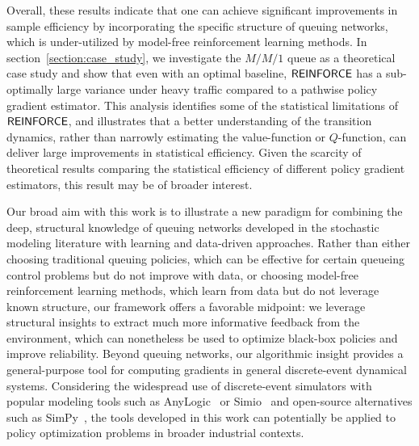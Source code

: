 Overall, these results indicate that one can achieve significant improvements in sample efficiency by incorporating the specific structure of queuing networks, which is under-utilized by model-free reinforcement learning methods. In section~\ref{section:case_study}, we investigate the $M/M/1$ queue as a theoretical case study and show that even with an optimal baseline, $\mathsf{REINFORCE}$ has a sub-optimally large variance under heavy traffic compared to a pathwise policy gradient estimator. This analysis identifies some of the statistical limitations of $\mathsf{REINFORCE}$, and illustrates that a better understanding of the transition dynamics, rather than narrowly estimating the value-function or $Q$-function, can deliver large improvements in statistical efficiency. Given the scarcity of theoretical results comparing the statistical efficiency of different policy gradient estimators, this result may be of broader interest.

Our broad aim with this work is to illustrate a new paradigm for combining the deep, structural knowledge of queuing networks developed in the stochastic modeling literature with learning and data-driven approaches.
Rather than either choosing traditional queuing policies, which can be effective for certain queueing control problems but do not improve with data, or choosing model-free reinforcement learning methods, which learn from data but do not leverage known structure, our framework offers a favorable midpoint: we leverage structural insights to extract much more informative feedback from the environment, which can nonetheless be used to optimize black-box policies and improve reliability. Beyond queuing networks, our algorithmic insight provides a general-purpose tool for computing gradients in general discrete-event dynamical systems. Considering the widespread use of discrete-event simulators with popular modeling tools such as AnyLogic~\cite{AnyLogic2024} or Simio~\cite{Simio2024} and open-source alternatives such as SimPy~\cite{matloff2008introduction}, the tools developed in this work can potentially be applied to policy optimization problems in broader industrial contexts.

